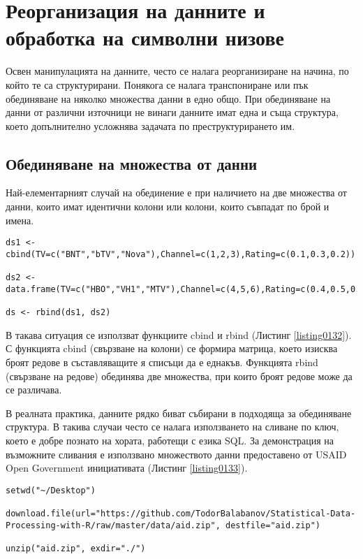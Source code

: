 ﻿\newpage
\chapter{Реорганизация на данните и обработка на символни низове}
\label{chapter07}
\thispagestyle{empty}

Освен манипулацията на данните, често се налага реорганизиране на начина, по който те са структурирани. Понякога се налага транспониране или пък обединяване на няколко множества данни в едно общо. При обединяване на данни от различни източници не винаги данните имат една и съща структура, което допълнително усложнява задачата по преструктурирането им.

\section{Обединяване на множества от данни}

Най-елементарният случай на обединение е при наличието на две множества от данни, които имат идентични колони или колони, които съвпадат по брой и имена.

\begin{lstlisting}[caption=Обединяване на множества от данни, label=listing0132]
ds1 <- cbind(TV=c("BNT","bTV","Nova"),Channel=c(1,2,3),Rating=c(0.1,0.3,0.2))

ds2 <- data.frame(TV=c("HBO","VH1","MTV"),Channel=c(4,5,6),Rating=c(0.4,0.5,0.6),stringsAsFactors=FALSE)

ds <- rbind(ds1, ds2)
\end{lstlisting}

В такава ситуация се използват функциите cbind и rbind (Листинг \ref{listing0132}). С функцията cbind (свързване на колони) се формира матрица, което изисква броят редове в съставляващите я списъци да е еднакъв. Функцията rbind (свързване на редове) обединява две множества, при които броят редове може да се различава.

В реалната практика, данните рядко биват събирани в подходяща за обединяване структура. В такива случаи често се налага използването на сливане по ключ, което е добре познато на хората, работещи с езика SQL. За демонстрация на възможните сливания е използвано множеството данни предоставено от USAID Open Government инициативата (Листинг \ref{listing0133}).

\begin{lstlisting}[caption=USAID множество от данни, label=listing0133]
setwd("~/Desktop")

download.file(url="https://github.com/TodorBalabanov/Statistical-Data-Processing-with-R/raw/master/data/aid.zip", destfile="aid.zip")

unzip("aid.zip", exdir="./")
\end{lstlisting}

